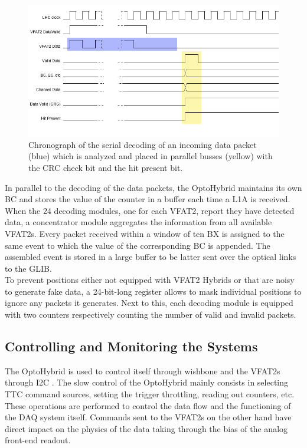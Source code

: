       \begin{figure}[h!]
        \centering
        \includegraphics[width=\textwidth]{img/II-3-test-beam/tkdata-chrono.png}
        \caption{Chronograph of the serial decoding of an incoming data packet (blue) which is analyzed and placed in parallel busses (yellow) with the CRC check bit and the hit present bit.}
        \label{fig:II-3-tkdata-chrono}
      \end{figure}

      In parallel to the decoding of the data packets, the OptoHybrid maintains its own BC and stores the value of the counter in a buffer each time a L1A is received. When the 24 decoding modules, one for each VFAT2, report they have detected data, a concentrator module aggregates the information from all available VFAT2s. Every packet received within a window of ten BX is assigned to the same event to which the value of the corresponding BC is appended. The assembled event is stored in a large buffer to be latter sent over the optical links to the GLIB. \\

      To prevent positions either not equipped with VFAT2 Hybrids or that are noisy to generate fake data, a 24-bit-long register allows to mask individual positions to ignore any packets it generates. Next to this, each decoding module is equipped with two counters respectively counting the number of valid and invalid packets.

    \subsection{Controlling and Monitoring the Systems}

      The OptoHybrid is used to control itself through wishbone and the VFAT2s through I2C \cite{i2c}. The slow control of the OptoHybrid mainly consists in selecting TTC command sources, setting the trigger throttling, reading out counters, etc. These operations are performed to control the data flow and the functioning of the DAQ system itself. Commands sent to the VFAT2s on the other hand have direct impact on the physics of the data taking through the bias of the analog front-end readout. \\

